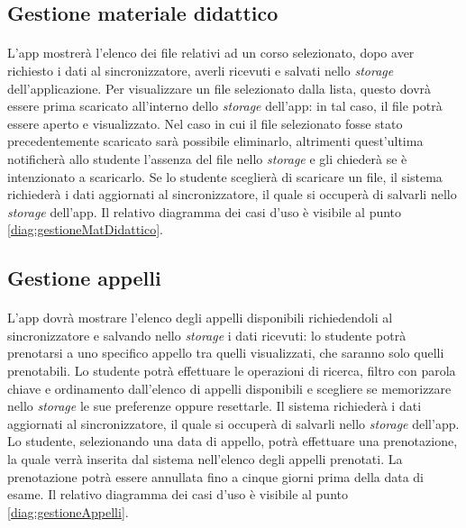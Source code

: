 \subsection{Gestione materiale didattico}
\paragraph{} 
L’app mostrerà l’elenco dei file relativi ad un corso selezionato, dopo aver richiesto i dati al sincronizzatore, averli ricevuti e salvati nello \textit{storage} dell’applicazione. Per visualizzare un file selezionato dalla lista, questo dovrà essere prima scaricato all’interno dello \textit{storage} dell’app: in tal caso, il file potrà essere aperto e visualizzato. Nel caso in cui il file selezionato fosse stato precedentemente scaricato sarà possibile eliminarlo, altrimenti quest’ultima notificherà allo studente l’assenza del file nello \textit{storage} e gli chiederà se è intenzionato a scaricarlo. Se lo studente sceglierà di scaricare un file, il sistema richiederà i dati aggiornati al sincronizzatore, il quale si occuperà di salvarli nello \textit{storage} dell’app.
Il relativo diagramma dei casi d'uso è visibile al punto \ref{diag:gestioneMatDidattico}.

\subsection{Gestione appelli}
\paragraph{} 
L’app dovrà mostrare l’elenco degli appelli disponibili richiedendoli al sincronizzatore e salvando nello \textit{storage} i dati ricevuti: lo studente potrà prenotarsi a uno specifico appello tra quelli visualizzati, che saranno solo quelli prenotabili. Lo studente potrà effettuare le operazioni di ricerca, filtro con parola chiave e ordinamento dall'elenco di appelli disponibili e scegliere se memorizzare nello \textit{storage} le sue preferenze oppure resettarle. Il sistema richiederà i dati aggiornati al sincronizzatore, il quale si occuperà di salvarli nello \textit{storage} dell’app. Lo studente, selezionando una data di appello, potrà effettuare una prenotazione, la quale verrà inserita dal sistema nell’elenco degli appelli prenotati. La prenotazione potrà essere annullata fino a cinque giorni prima della data di esame.
Il relativo diagramma dei casi d'uso è visibile al punto \ref{diag:gestioneAppelli}.

